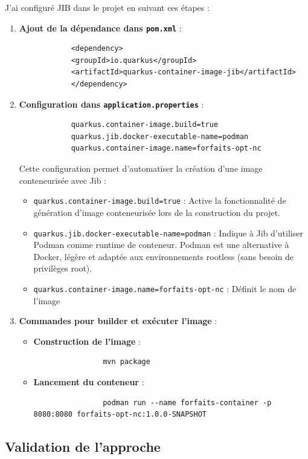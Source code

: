 \documentclass{article}
\begin{document}
	J'ai configuré JIB dans le projet en suivant ces étapes :
	\begin{enumerate}
		\item \textbf{Ajout de la dépendance dans \texttt{pom.xml}} :
		\begin{lstlisting}
			<dependency>
			<groupId>io.quarkus</groupId>
			<artifactId>quarkus-container-image-jib</artifactId>
			</dependency>
		\end{lstlisting}
		
		\item \textbf{Configuration dans \texttt{application.properties}} :
		\begin{verbatim}
			quarkus.container-image.build=true
			quarkus.jib.docker-executable-name=podman
			quarkus.container-image.name=forfaits-opt-nc
		\end{verbatim}
		
		Cette configuration permet d'automatiser la création d'une image conteneurisée avec Jib :
		
		\begin{itemize}
			\item \texttt{quarkus.container-image.build=true} : Active la fonctionnalité de génération d'image conteneurisée lors de la construction du projet.
			\item \texttt{quarkus.jib.docker-executable-name=podman} : Indique à Jib d'utiliser Podman comme runtime de conteneur. Podman est une alternative à Docker, légère et adaptée aux environnements rootless (sans besoin de privilèges root).
			\item \texttt{quarkus.container-image.name=forfaits-opt-nc} : Définit le nom de l'image
		\end{itemize}
		\item \textbf{Commandes pour builder et exécuter l'image} :
		\begin{itemize}
			\item \textbf{Construction de l'image} :
			\begin{verbatim}
				mvn package
			\end{verbatim}
			\item \textbf{Lancement du conteneur} :
			\begin{verbatim}
				podman run --name forfaits-container -p 8080:8080 forfaits-opt-nc:1.0.0-SNAPSHOT
			\end{verbatim}
		\end{itemize}
	\end{enumerate}
	\subsection{Validation de l'approche}
	
\end{document}
